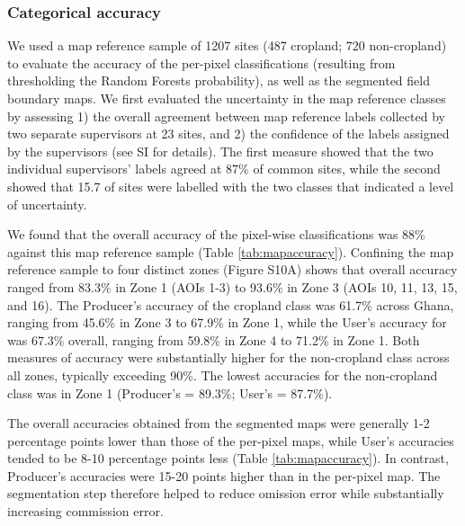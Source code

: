 \documentclass[11pt,a4paper]{article}
\begin{document}
\hypertarget{categorical-accuracy}{%
\subsubsection{Categorical accuracy}\label{categorical-accuracy}}

We used a map reference sample of 1207 sites (487 cropland; 720
non-cropland) to evaluate the accuracy of the per-pixel classifications
(resulting from thresholding the Random Forests probability), as well as
the segmented field boundary maps. We first evaluated the uncertainty in
the map reference classes by assessing 1) the overall agreement between
map reference labels collected by two separate supervisors at 23 sites,
and 2) the confidence of the labels assigned by the supervisors (see SI
for details). The first measure showed that the two individual
supervisors' labels agreed at 87\% of common sites, while the second
showed that 15.7 of sites were labelled with the two classes that
indicated a level of uncertainty.

We found that the overall accuracy of the pixel-wise classifications was
88\% against this map reference sample (Table \ref{tab:mapaccuracy}).
Confining the map reference sample to four distinct zones (Figure S10A)
shows that overall accuracy ranged from 83.3\% in Zone 1 (AOIs 1-3) to
93.6\% in Zone 3 (AOIs 10, 11, 13, 15, and 16). The Producer's accuracy
of the cropland class was 61.7\% across Ghana, ranging from 45.6\% in
Zone 3 to 67.9\% in Zone 1, while the User's accuracy for was 67.3\%
overall, ranging from 59.8\% in Zone 4 to 71.2\% in Zone 1. Both
measures of accuracy were substantially higher for the non-cropland
class across all zones, typically exceeding 90\%. The lowest accuracies
for the non-cropland class was in Zone 1 (Producer's = 89.3\%; User's =
87.7\%).

The overall accuracies obtained from the segmented maps were generally
1-2 percentage points lower than those of the per-pixel maps, while
User's accuracies tended to be 8-10 percentage points less (Table
\ref{tab:mapaccuracy}). In contrast, Producer's accuracies were 15-20
points higher than in the per-pixel map. The segmentation step therefore
helped to reduce omission error while substantially increasing
commission error.
\end{document}
